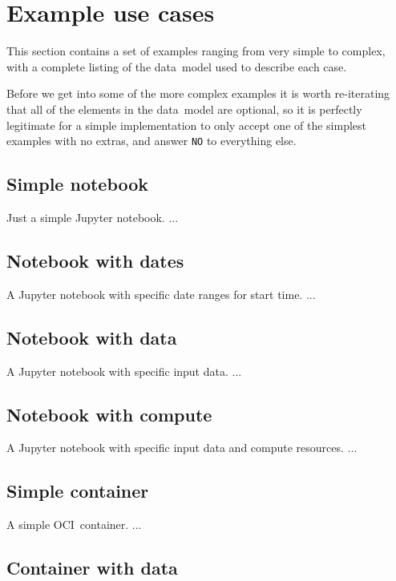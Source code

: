 \documentclass[11pt,a4paper]{ivoa}
\newcommand{\datamodel} {data~model}
\newcommand{\jupyter} {Jupyter}
\newcommand{\jupyternotebook} {Jupyter notebook}
\newcommand{\ocicontainer} {OCI~container}
\newcommand{\codeword}[1] {\texttt{#1}}
\begin{document}
\section{Example use cases}
\label{example-usecases}

This section contains a set of examples ranging from very simple to complex, with a complete
listing of the \datamodel{} used to describe each case.

Before we get into some of the more complex examples it is worth re-iterating that all of the
elements in the \datamodel{} are optional, so it is perfectly legitimate for a simple
implementation to only accept one of the simplest examples with no extras, and answer
\codeword{NO} to everything else.

\subsection{Simple notebook}
\label{simple-notebook}

Just a simple \jupyternotebook{}.
...

\subsection{Notebook with dates}
\label{notebook-with-dates}

A \jupyter{} notebook with specific date ranges for start time.
...

\subsection{Notebook with data}
\label{notebook-with-data}

A \jupyternotebook{} with specific input data.
...

\subsection{Notebook with compute}
\label{notebook-with-compute}

A \jupyternotebook{} with specific input data and compute resources.
...

\subsection{Simple container}
\label{simple-container}

A simple \ocicontainer{}.
...

\subsection{Container with data}
\label{container-with-data}
\end{document}
